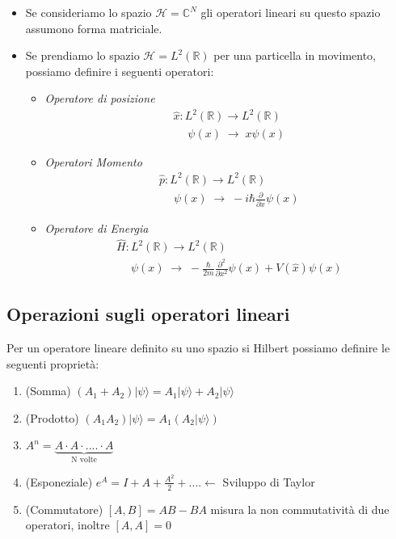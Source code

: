 \begin{itemize}
	\item Se consideriamo lo spazio $\mathcal{H} = \mathbb{C}^N$ gli operatori lineari su questo spazio assumono forma matriciale.
	\item Se prendiamo lo spazio $\mathcal{H} = L^2(\mathbb{R})$ per una particella in movimento, possiamo definire i seguenti operatori:
	\begin{itemize}
	\item \textit{Operatore di posizione }\begin{equation*}
		\begin{array}{l}
			\hat{x} : L^2(\mathbb{R}) \to L^2(\mathbb{R}) \\[0.2cm]
			\quad \; \psi(x) \; \to \; x\psi(x)
		\end{array}
	\end{equation*}
	\item \textit{Operatori Momento}
	\begin{equation*}
		\begin{array}{l}
			\hat{p} : L^2(\mathbb{R}) \to L^2(\mathbb{R}) \\[0.2cm]
			\quad \; \psi(x) \; \to \; -i \hbar \frac{\partial}{\partial x}\psi(x)
		\end{array}
	\end{equation*}
	\item \textit{Operatore di Energia }
	\begin{equation*}
		\begin{array}{l}
			\hat{H} : L^2(\mathbb{R}) \to L^2(\mathbb{R}) \\[0.2cm]
			\quad \; \psi(x) \; \to \; -\frac{\hbar}{2m} \frac{\partial^2}{\partial x^2}\psi(x) + V(\hat{x})\psi(x)
		\end{array}
	\end{equation*}
	\end{itemize}
\end{itemize}

\subsection{Operazioni sugli operatori lineari}

Per un operatore lineare definito su uno spazio si Hilbert possiamo definire le seguenti propriet\`a:

\begin{enumerate}
	\item (Somma) $(A_1 + A_2)|\psi \rangle = A_1|\psi \rangle + A_2 |\psi \rangle $
	\item (Prodotto) $(A_1 A_2)|\psi \rangle = A_1(A_2|\psi \rangle) $
	\item $A^n = \underbrace{A \cdot A \cdot ....\cdot A}_{\text{N volte}}$\
	\item (Esponeziale) $e^A = I + A + \frac{A^2}{2} + .... \leftarrow$ Sviluppo di Taylor 
	\item (Commutatore)  $[A,B] = AB-BA$  misura la non commutativit\`a di due operatori, inoltre $[A,A] = 0$
\end{enumerate} 

